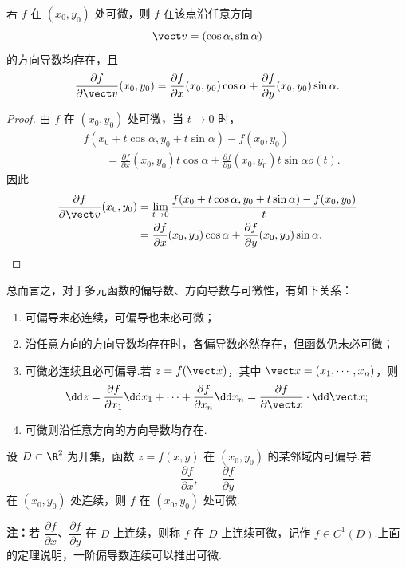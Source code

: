 \begin{proposition}
	若 $f$ 在 $(x_0,y_0)$ 处可微，则 $f$ 在该点沿任意方向
	\[
	\vect v=(\cos\alpha,\sin\alpha)
	\]
	的方向导数均存在，且
	\[
	\frac{\partial f}{\partial\vect v}(x_0,y_0)
	=
	\frac{\partial f}{\partial x}(x_0,y_0)\cos\alpha
	+
	\frac{\partial f}{\partial y}(x_0,y_0)\sin\alpha.
	\]
\end{proposition}

\begin{proof}
	由 $f$ 在 $(x_0,y_0)$ 处可微，当 $t\to0$ 时，
	\[
	\begin{aligned}
	&f(x_0+t\cos\alpha,y_0+t\sin\alpha)-f(x_0,y_0)\\
	&\qquad=
	\frac{\partial f}{\partial x}(x_0,y_0)t\cos\alpha
	+
	\frac{\partial f}{\partial y}(x_0,y_0)t\sin\alpha
o(t).
	\end{aligned}
	\]
	因此
	\[
	\begin{aligned}
	\frac{\partial f}{\partial\vect v}(x_0,y_0)
	&=
	\lim_{t\to0}
	\frac{f(x_0+t\cos\alpha,y_0+t\sin\alpha)-f(x_0,y_0)}{t}\\
	&=
	\frac{\partial f}{\partial x}(x_0,y_0)\cos\alpha
	+
	\frac{\partial f}{\partial y}(x_0,y_0)\sin\alpha.
	\end{aligned}
	\]
\end{proof}

总而言之，对于多元函数的偏导数、方向导数与可微性，有如下关系：
\begin{enumerate}
	\item 可偏导未必连续，可偏导也未必可微；
	\item 沿任意方向的方向导数均存在时，各偏导数必然存在，但函数仍未必可微；
	\item 可微必连续且必可偏导.若 $z=f(\vect x)$，其中
	$\vect x=(x_1,\cdots,x_n)$，则
	\[
	\dd z
	=
	\frac{\partial f}{\partial x_1}\dd x_1
	+\cdots+
	\frac{\partial f}{\partial x_n}\dd x_n
	=
	\frac{\partial f}{\partial\vect x}\cdot\dd\vect x;
	\]
	\item 可微则沿任意方向的方向导数均存在.
\end{enumerate}

\begin{theorem}
	设 $D\subset\R^2$ 为开集，函数 $z=f(x,y)$ 在 $(x_0,y_0)$ 的某邻域内可偏导.若
	\[
	\frac{\partial f}{\partial x},\qquad
	\frac{\partial f}{\partial y}
	\]
	在 $(x_0,y_0)$ 处连续，则 $f$ 在 $(x_0,y_0)$ 处可微.
\end{theorem}

\textbf{注：}若 $\dfrac{\partial f}{\partial x}$、$\dfrac{\partial f}{\partial y}$ 在 $D$ 上连续，则称 $f$ 在 $D$ 上连续可微，记作 $f\in C^1(D)$.上面的定理说明，一阶偏导数连续可以推出可微.

